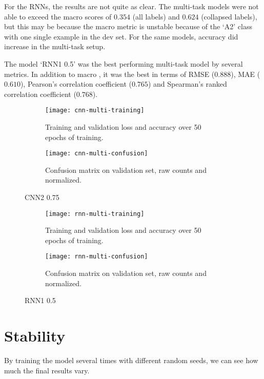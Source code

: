 For the RNNs, the results are not quite as clear. The multi-task models were
not able to exceed the macro \FI scores of $0.354$ (all labels) and $0.624$
(collapsed labels), but this may be because the macro \FI metric is unstable
because of the `A2' class with one single example in the dev set. For the
same models, accuracy did increase in the multi-task setup.

The model `RNN1 0.5' was the best performing multi-task model by several
metrics. In addition to macro \FI, it was the best in terms of RMSE
($0.888$), MAE ($0.610$), Pearson's correlation coefficient ($0.765$) and
Spearman's ranked correlation coefficient ($0.768$).


\begin{figure}
  \begin{subfigure}{\linewidth}
    \centering
    \texttt{[image: cnn-multi-training]}
    \caption{Training and validation loss and accuracy over 50 epochs of training.}
  \end{subfigure}
  \begin{subfigure}{\linewidth}
    \centering
    \texttt{[image: cnn-multi-confusion]}
    \caption{Confusion matrix on validation set, raw counts and normalized.}
  \end{subfigure}
  \caption{CNN2 0.75}
  \label{fig:cnn-multi-training}
\end{figure}

\begin{figure}
  \begin{subfigure}{\linewidth}
    \centering
    \texttt{[image: rnn-multi-training]}
    \caption{Training and validation loss and accuracy over 50 epochs of training.}
  \end{subfigure}
  \begin{subfigure}{\linewidth}
    \centering
    \texttt{[image: rnn-multi-confusion]}
    \caption{Confusion matrix on validation set, raw counts and normalized.}
  \end{subfigure}
  \caption{RNN1 0.5}
  \label{fig:rnn-multi-training}
\end{figure}


\section{Stability}

By training the model several times with different random seeds, we can see
how much the final results vary.



